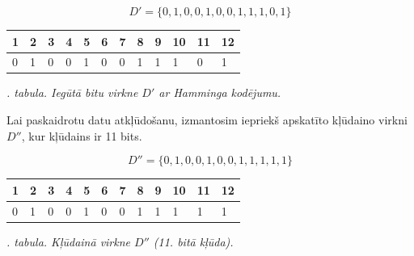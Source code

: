 \documentclass[12pt, a4paper, oneside, openright]{article}
\renewcommand{\thectables}{\arabic{ctables}}
\begin{document}
$$
D' = \{0,1,0,0,1,0,0,1,1,1,0,1\} 
$$

\begin{samepage}
\vspace{-0.5cm}
\begin{table}[h]
\centering
\begin{tabular}{|l|l|l|l|l|l|l|l|l|l|l|l|}
\hline
1 & 2 & 3 & 4 & 5 & 6 & 7 & 8 & 9 & 10 & 11 & 12 \\ \hline
\cellcolor[HTML]{FFFFC7}0 & \cellcolor[HTML]{FFFFC7}1 & 0 & \cellcolor[HTML]{FFFFC7}0 & 1 & 0 & 0 & \cellcolor[HTML]{FFFFC7}1 & 1 & 1  & 0  & 1  \\ \hline
\end{tabular}
\end{table}
\vspace{-0.5cm}
\label{ctables:hamming_1}
\begin{center}
\footnotesize{
\textit{\thectables. tabula. Iegūtā bitu virkne $D'$ ar Hamminga kodējumu.}}
\end{center}
\end{samepage}

Lai paskaidrotu datu atkļūdošanu, izmantosim iepriekš apskatīto kļūdaino virkni $D''$, kur kļūdains ir 11 bits.

$$
D'' = \{0,1,0,0,1,0,0,1,1,1,1,1\} 
$$

\newpage
\begin{samepage}
\begin{table}[h]
\centering
\begin{tabular}{|l|l|l|l|l|l|l|l|l|l|l|l|}
\hline
1 & 2 & 3 & 4 & 5 & 6 & 7 & 8 & 9 & 10 & 11 & 12 \\ \hline
\cellcolor[HTML]{FFFFC7}0 & \cellcolor[HTML]{FFFFC7}1 & 0 & \cellcolor[HTML]{FFFFC7}0 & 1 & 0 & 0 & \cellcolor[HTML]{FFFFC7}1 & 1 & 1  & \cellcolor[HTML]{FFCCC9}1  & 1  \\ \hline
\end{tabular}
\end{table}
\vspace{-0.5cm}
\label{ctables:hamming_1}
\begin{center}
\footnotesize{
\textit{\thectables. tabula. Kļūdainā virkne $D''$ (11. bitā kļūda).}}
\end{center}
\end{samepage}
\end{document}
